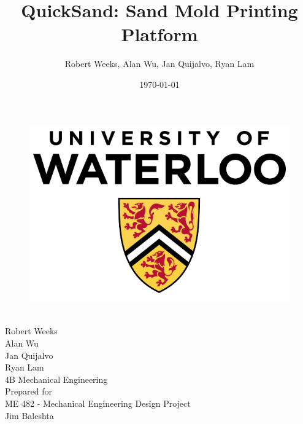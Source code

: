 \documentclass[11pt]{article}
\begin{document}
\title{\textbf{QuickSand: Sand Mold Printing Platform}}
\author{Robert Weeks, Alan Wu, Jan Quijalvo, Ryan Lam}
\date{\today}

\makeatletter
    \begin{titlepage}
        \begin{center}
        	\begin{figure}[h]
        	\centering
            \includegraphics[scale=0.3]{./figures/University-of-Waterloo}
            \end{figure}
            \vspace{20mm}
            {\huge \bfseries  \@title }\\[2ex] 
            \vspace{5mm}
            {\LARGE Robert Weeks}\\
            \vspace{2mm}
            {\LARGE Alan Wu}\\
            \vspace{2mm}
            {\LARGE Jan Quijalvo}\\
            \vspace{2mm}
            {\LARGE Ryan Lam}\\
            \vspace{2mm}
            \LARGE 4B Mechanical Engineering\\[12ex]
            Prepared for\\
            ME 482 - Mechanical Engineering Design Project \\
            Jim Baleshta\\
            \centering
            \vfill
            {\large \@date}
        \end{center}
    \end{titlepage}
\makeatother
\end{document}
